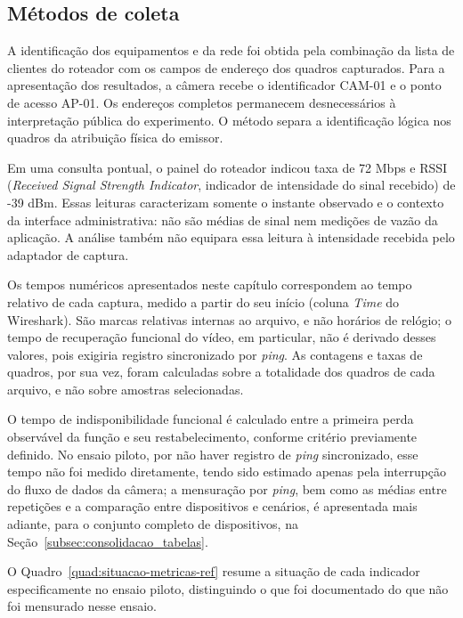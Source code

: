 \subsection{Métodos de coleta}

A identificação dos equipamentos e da rede foi obtida pela combinação da lista de clientes do roteador com os campos de endereço dos quadros capturados. Para a apresentação dos resultados, a câmera recebe o identificador CAM-01 e o ponto de acesso AP-01. Os endereços completos permanecem desnecessários à interpretação pública do experimento. O método separa a identificação lógica nos quadros da atribuição física do emissor.



Em uma consulta pontual, o painel do roteador indicou taxa de 72 Mbps e RSSI (\textit{Received Signal Strength Indicator}, indicador de intensidade do sinal recebido) de -39 dBm. Essas leituras caracterizam somente o instante observado e o contexto da interface administrativa: não são médias de sinal nem medições de vazão da aplicação. A análise também não equipara essa leitura à intensidade recebida pelo adaptador de captura.



Os tempos numéricos apresentados neste capítulo correspondem ao tempo relativo de cada captura, medido a partir do seu início (coluna \textit{Time} do Wireshark). São marcas relativas internas ao arquivo, e não horários de relógio; o tempo de recuperação funcional do vídeo, em particular, não é derivado desses valores, pois exigiria registro sincronizado por \textit{ping}. As contagens e taxas de quadros, por sua vez, foram calculadas sobre a totalidade dos quadros de cada arquivo, e não sobre amostras selecionadas.



O tempo de indisponibilidade funcional é calculado entre a primeira perda observável da função e seu restabelecimento, conforme critério previamente definido. No ensaio piloto, por não haver registro de \textit{ping} sincronizado, esse tempo não foi medido diretamente, tendo sido estimado apenas pela interrupção do fluxo de dados da câmera; a mensuração por \textit{ping}, bem como as médias entre repetições e a comparação entre dispositivos e cenários, é apresentada mais adiante, para o conjunto completo de dispositivos, na Seção~\ref{subsec:consolidacao_tabelas}.

O Quadro~\ref{quad:situacao-metricas-ref} resume a situação de cada indicador especificamente no ensaio piloto, distinguindo o que foi documentado do que não foi mensurado nesse ensaio.



